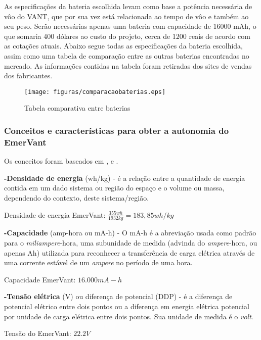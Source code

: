 As especificações da bateria escolhida levam como base a potência necessária de vôo do VANT, que por sua vez está relacionada ao tempo de vôo e também ao seu peso.  Serão necessárias apenas uma bateria com capacidade de 16000 mAh, o que somaria 400 dólares ao custo do projeto, cerca de 1200 reais de acordo com as cotações atuais. Abaixo segue todas as especificações da bateria escolhida, assim como uma tabela de comparação entre as outras baterias encontradas no mercado. 
As informações contidas na tabela foram retiradas dos sites de vendas dos fabricantes.
 \begin{figure}[h!]
    \centering
	\texttt{[image: figuras/comparacaobaterias.eps]}
    \caption{Tabela comparativa entre baterias}
\end{figure}

\nocite{bateria1}
\nocite{bateria2}
\nocite{bateria3}
\nocite{bateria4}
\nocite{bateria5}
\nocite{bateria6}
\nocite{bateria7}
\nocite{bateria8}
\nocite{bateria9}
\nocite{bateria10}


\subsubsection{Conceitos e características para obter a autonomia do EmerVant}

Os conceitos foram baseados em \cite{charlesa}, \cite{charlesb} e \cite{gibbs}.

\textbf{-Densidade de energia} (wh/kg) - é a relação entre a quantidade de energia contida em um dado sistema ou região do espaço e o volume ou massa, dependendo do contexto, deste sistema/região.

	Densidade de energia EmerVant: $\frac{355wh}{1932kg} =  183,85 wh/kg$

\textbf{-Capacidade} (amp-hora ou mA-h) -  O mA-h é a abreviação usada como padrão para o \textit{miliampere}-hora, uma subunidade de medida (advinda do \textit{ampere}-hora, ou apenas Ah) utilizada para reconhecer a transferência de carga elétrica através de uma corrente estável de um \textit{ampere} no período de uma hora.

	Capacidade EmerVant: $16.000mA-h$

\textbf{-Tensão elétrica} (V) ou diferença de potencial (DDP) - é a diferença de potencial elétrico entre dois pontos ou a diferença em energia elétrica potencial por unidade de carga elétrica entre dois pontos. Sua unidade de medida é o \textit{volt}.
	
	Tensão do EmerVant: $22.2 V$

